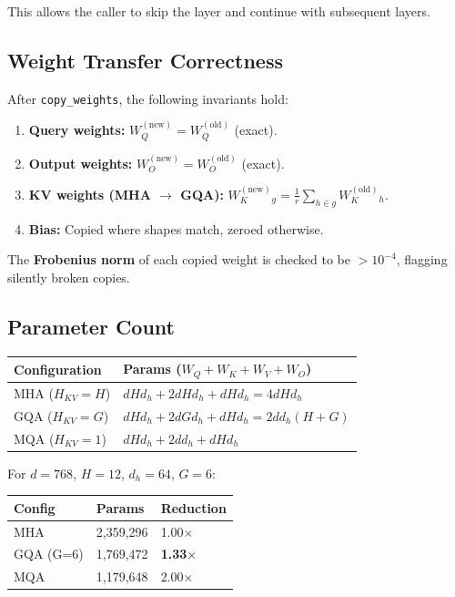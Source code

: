 This allows the caller to skip the layer and continue with subsequent layers.

\subsection{Weight Transfer Correctness}

After \texttt{copy\_weights}, the following invariants hold:

\begin{enumerate}
\item \textbf{Query weights:} $W_Q^{(\text{new})} = W_Q^{(\text{old})}$ (exact).
\item \textbf{Output weights:} $W_O^{(\text{new})} = W_O^{(\text{old})}$ (exact).
\item \textbf{KV weights (MHA $\to$ GQA):} $W_K^{(\text{new})}_g = \frac{1}{r} \sum_{h \in g} W_K^{(\text{old})}_h$.
\item \textbf{Bias:} Copied where shapes match, zeroed otherwise.

\end{enumerate}
The \textbf{Frobenius norm} of each copied weight is checked to be $> 10^{-4}$, 
flagging silently broken copies.

\subsection{Parameter Count}

\begin{table}[H]
\centering
\small
\begin{tabular}{ll}
\toprule
\textbf{Configuration} & \textbf{Params ($W_Q + W_K + W_V + W_O$)} \\
\midrule
MHA ($H_{KV} = H$) & $d H d_h + 2 d H d_h + d H d_h = 4 d H d_h$ \\
GQA ($H_{KV} = G$) & $d H d_h + 2 d G d_h + d H d_h = 2 d d_h (H + G)$ \\
MQA ($H_{KV} = 1$) & $d H d_h + 2 d d_h + d H d_h$ \\
\bottomrule
\end{tabular}
\end{table}

For $d = 768$, $H = 12$, $d_h = 64$, $G = 6$:

\begin{table}[H]
\centering
\small
\begin{tabular}{lll}
\toprule
\textbf{Config} & \textbf{Params} & \textbf{Reduction} \\
\midrule
MHA & 2,359,296 & 1.00$\times$ \\
GQA (G=6) & 1,769,472 & \textbf{1.33$\times$} \\
MQA & 1,179,648 & 2.00$\times$ \\
\bottomrule
\end{tabular}
\end{table}

